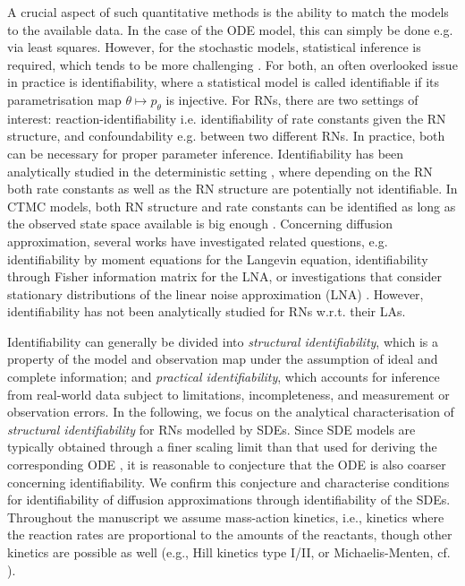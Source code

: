 \documentclass[10pt,a4paper]{amsart}
\theoremstyle{definition}
\theoremstyle{remark}
\theoremstyle{consequence}
\numberwithin{equation}{section}
\begin{document}
A crucial aspect of such quantitative methods is the ability to match the models to the available data. In the case of the ODE model, this can simply be done e.g. via least squares. However, for the stochastic models, statistical inference is required, which tends to be more challenging \cite{mazza,wilkinson2018stochastic}. For both, an often overlooked issue in practice is identifiability, where a statistical model is called identifiable if its parametrisation map $\theta\mapsto p_\theta$ is injective. For RNs, there are two settings of interest: reaction-identifiability i.e. identifiability of rate constants given the RN structure, and confoundability e.g. between two different RNs. In practice, both can be necessary for proper parameter inference. Identifiability has been analytically studied in the deterministic setting \cite{ident_CRNs}, where depending on the RN both rate constants as well as the RN structure are potentially not identifiable. In CTMC models, both RN structure and rate constants can be identified as long as the observed state space available is big enough \cite{enciso2020identifiability}. Concerning diffusion approximation, several works have investigated related questions, e.g.
identifiability by moment equations \cite{ident_review} for the Langevin equation, identifiability through Fisher information matrix \cite{ident_LNA} for the LNA, or investigations that consider stationary distributions of the linear noise approximation (LNA) \cite{grunberg2023identifiability}. However, identifiability has not been analytically studied for RNs w.r.t. their LAs. 

Identifiability can generally be divided into \emph{structural identifiability}, which is a property of the model and observation map under the assumption of ideal and complete information; and \emph{practical identifiability}, which accounts for inference from real-world data subject to limitations, incompleteness, and measurement or observation errors. In the following, we focus on the analytical characterisation of \emph{structural identifiability} for RNs modelled by SDEs. Since SDE models are typically obtained through a finer scaling limit than that used for deriving the corresponding ODE \cite{approx_kurtz}, it is reasonable to conjecture that the ODE is also coarser concerning identifiability. We confirm this conjecture and characterise conditions for identifiability of diffusion approximations through identifiability of the SDEs. Throughout the manuscript we assume mass-action kinetics, i.e., kinetics where the reaction rates are proportional to the amounts of the reactants, though other kinetics are possible as well (e.g., Hill kinetics type I/II, or Michaelis-Menten, cf. \cite{anderson2,reg_cellular,horn3,grima_kin}).
\end{document}
